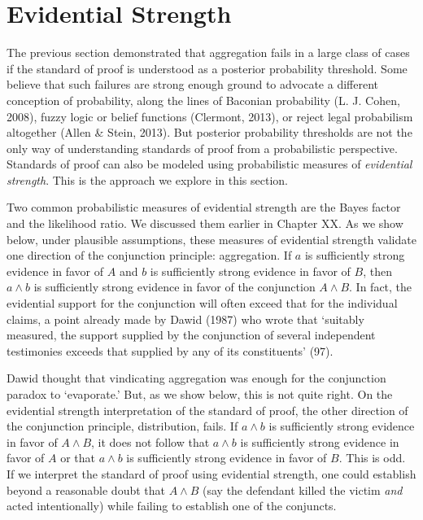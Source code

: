 \documentclass[
  10pt,
  dvipsnames,enabledeprecatedfontcommands]{scrartcl}
\begin{document}
\hypertarget{evidential-strength}{%
\section{Evidential Strength}\label{evidential-strength}}

\label{sec:strength}

The previous section demonstrated that aggregation fails in a large
class of cases if the standard of proof is understood as a posterior
probability threshold. Some believe that such failures are strong enough
ground to advocate a different conception of probability, along the
lines of Baconian probability (L. J. Cohen, 2008), fuzzy logic or belief
functions (Clermont, 2013), or reject legal probabilism altogether
(Allen \& Stein, 2013). But posterior probability thresholds are not the
only way of understanding standards of proof from a probabilistic
perspective. Standards of proof can also be modeled using probabilistic
measures of \textit{evidential strength}. This is the approach we
explore in this section.

Two common probabilistic measures of evidential strength are the Bayes
factor and the likelihood ratio. We discussed them earlier in Chapter
XX.  As we show below, under plausible
assumptions, these measures of evidential strength validate one
direction of the conjunction principle: aggregation. If \(a\) is
sufficiently strong evidence in favor of \(A\) and \(b\) is sufficiently
strong evidence in favor of \(B\), then \(a\wedge b\) is sufficiently
strong evidence in favor of the conjunction \(A \wedge B\). In fact, the
evidential support for the conjunction will often exceed that for the
individual claims, a point already made by Dawid (1987) who wrote that
`suitably measured, the support supplied by the conjunction of several
independent testimonies exceeds that supplied by any of its
constituents' (97).

Dawid thought that vindicating aggregation was enough for the
conjunction paradox to `evaporate.' But, as we show below, this is not
quite right. On the evidential strength interpretation of the standard
of proof, the other direction of the conjunction principle,
distribution, fails. If \(a \wedge b\) is sufficiently strong evidence
in favor of \(A \wedge B\), it does not follow that \(a\wedge b\) is
sufficiently strong evidence in favor of \(A\) or that \(a\wedge b\) is
sufficiently strong evidence in favor of \(B\). This is odd. If we
interpret the standard of proof using evidential strength, one could
establish beyond a reasonable doubt that \(A \wedge B\) (say the
defendant killed the victim \textit{and} acted intentionally) while
failing to establish one of the conjuncts.
\end{document}
